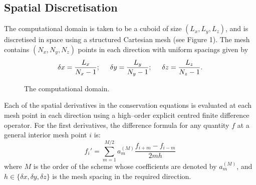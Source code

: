 \documentclass[dvips]{article}
\begin{document}
\subsection{Spatial Discretisation}
The computational domain is taken to be a cuboid of size
$(L_{x}, L_{y}, L_{z})$, and is discretised in space using a structured
Cartesian mesh (see Figure 1).  The mesh contains $(N_{x}, N_{y}, N_{z})$
points in each direction with uniform spacings given by
\begin{equation}
\delta x = \frac{L_{x}}{N_{x}-1};\hspace{5mm}
\delta y = \frac{L_{y}}{N_{y}-1};\hspace{5mm}
\delta z = \frac{L_{z}}{N_{z}-1}.
\end{equation}

\begin{figure}[htbp]
\begin{center}
\caption{The computational domain.}
\end{center}
\end{figure}

\noindent
Each of the spatial derivatives in the conservation equations is
evaluated at each mesh point in each direction using a high--order explicit
centred finite difference operator.  For the first derivatives, the
difference formula for any quantity $f$ at a general interior mesh point
$i$ is:
\begin{equation}
f_{i}' = \sum_{m=1}^{M/2} a_{m}^{(M)}\frac{f_{i+m} - f_{i-m}}{2mh}
\label{FIRSTDERIV}
\end{equation}
where $M$ is the order of the scheme whose coefficients are denoted by
$a_{m}^{(M)}$, and $h\in\{\delta x,\delta y,\delta z\}$ is the mesh spacing
in the required direction.\\[2mm]
\end{document}
